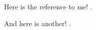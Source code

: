 \documentclass{article}
\begin{document}
Here is the reference to me! \cite{source1}. 

And here is another! \cite{source1}.

\printbibliography
\end{document}
